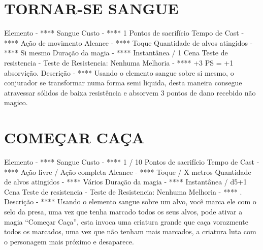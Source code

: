 \documentclass{article}%
\begin{document}
\section{TORNAR{-}SE SANGUE}%
\label{sec:TORNAR{-}SESANGUE}%
Elemento {-} **** Sangue\newline%
Custo {-} **** 1 Pontos de sacrifício\newline%
Tempo de Cast {-} **** Ação de movimento\newline%
Alcance {-} **** Toque\newline%
Quantidade de alvos atingidos {-} **** Si mesmo\newline%
Duração da magia {-} **** Instantânea / 1 Cena\newline%
Teste de resistencia {-} Teste de Resistencia: Nenhuma\newline%
Melhoria {-} **** +3 PS = +1 absorvição.\newline%
Descrição {-} **** Usando o elemento sangue sobre si mesmo, o conjurador se transformar numa forma semi liquida, desta maneira consegue atravessar sólidos de baixa resistência e absorvem 3 pontos de dano recebido não magico.\newline%

%
\section{COMEÇAR CAÇA}%
\label{sec:COMEARCAA}%
Elemento {-} **** Sangue\newline%
Custo {-} **** 1 / 10 Pontos de sacrifício\newline%
Tempo de Cast {-} **** Ação livre / Ação completa\newline%
Alcance {-} **** Toque / X metros\newline%
Quantidade de alvos atingidos {-} **** Vários\newline%
Duração da magia {-} **** Instantânea / d5+1 Cena\newline%
Teste de resistencia {-} Teste de Resistencia: Nenhuma\newline%
Melhoria {-} **** .\newline%
Descrição {-} **** Usando o elemento sangue sobre um alvo, você marca ele com o selo da presa, uma vez que tenha marcado todos os seus alvos, pode ativar a magia “Começar Caça”, esta invoca uma criatura grande que caça vorazmente todos os marcados, uma vez que não tenham mais marcados, a criatura luta com o personagem mais próximo e desaparece.\newline%
\end{document}
